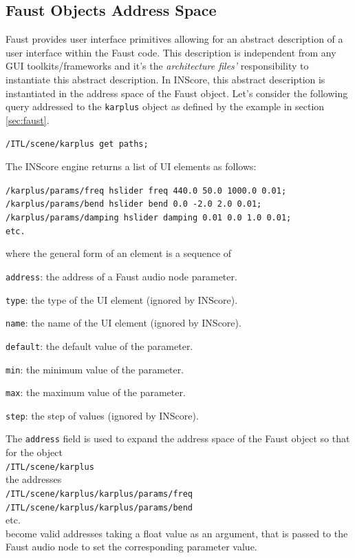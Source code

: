 \documentclass{article}
\newcommand{\ispace}	{\setlength\itemsep{0mm}}
\newcommand{\icode}[1]	{{\small \texttt{#1}}}
\newcommand{\code}[1]	{\vspace{-1em}\begin{center}\colorbox{mygrey}{\begin{minipage}[t]{0.98\columnwidth} {\scriptsize \texttt{#1}}\end{minipage}}\end{center}}
\begin{document}
\subsection{Faust Objects Address Space}\label{faustadrspace}

Faust provides user interface primitives allowing for an abstract description of a user interface within the Faust code. This description is independent from any GUI toolkits/frameworks and it's the \emph{architecture files'} \cite{fober:hal-02158816} responsibility to instantiate this abstract description. In INScore, this abstract description is instantiated in the address space of the Faust object.
Let's consider the following query addressed to the \icode{karplus} object as defined by the example in section \ref{sec:faust}.

\code{/ITL/scene/karplus get paths;}

The INScore engine returns a list of UI elements as follows:
\code{/karplus/params/freq hslider freq 440.0 50.0 1000.0 0.01;\\
/karplus/params/bend hslider bend 0.0 -2.0 2.0 0.01;\\
/karplus/params/damping hslider damping 0.01 0.0 1.0 0.01;\\
etc.}
where the general form of an element is a sequence of
\begin{description}
\ispace
\item[] \icode{address}: the address of a Faust audio node parameter.
\item[] \icode{type}: the type of the UI element (ignored by INScore).
\item[] \icode{name}: the name of the UI element (ignored by INScore).
\item[] \icode{default}: the default value of the parameter.
\item[] \icode{min}: the minimum value of the parameter.
\item[] \icode{max}: the maximum value of the parameter.
\item[] \icode{step}: the step of values (ignored by INScore).
\end{description}

The \icode{address} field is used to expand the address space of the Faust object so that for the object \\
\icode{/ITL/scene/karplus}\\
 the addresses\\
\icode{/ITL/scene/karplus/karplus/params/freq} \\
\icode{/ITL/scene/karplus/karplus/params/bend} \\
etc. \\
become valid addresses taking a float value as an argument, that is passed to the Faust audio node to set the corresponding parameter value. 
\end{document}

